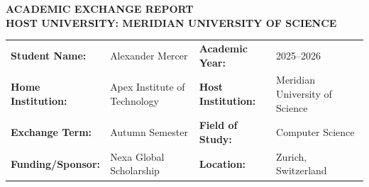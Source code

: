 \documentclass[11pt,a4paper]{article}
\begin{document}
\begin{center}
  \begin{tcolorbox}[
    enhanced,
    colback=primarycolor,
    colframe=primarycolor,
    arc=0pt,
    top=18pt,
    bottom=18pt,
    left=15pt,
    right=15pt,
    halign=center
  ]
    {\color{white}\Huge\bfseries\sffamily ACADEMIC EXCHANGE REPORT} \\[\baselineskip]
    {\color{accentcolor}\large\bfseries\sffamily HOST UNIVERSITY: MERIDIAN UNIVERSITY OF SCIENCE}
  \end{tcolorbox}
\end{center}

\vspace{10pt}

\begin{tcolorbox}[
  colback=lightgray,
  colframe=primarycolor,
  arc=4pt,
  boxrule=1pt,
  title=\sffamily\bfseries\color{white}\faUser\quad Student \& Exchange Profile,
  halign title=left
]
  \sffamily
  \small
  \begin{tabularx}{\textwidth}{l X l X}
    \textbf{Student Name:} & Alexander Mercer & \textbf{Academic Year:} & 2025--2026 \\
    \textbf{Home Institution:} & Apex Institute of Technology & \textbf{Host Institution:} & Meridian University of Science \\
    \textbf{Exchange Term:} & Autumn Semester & \textbf{Field of Study:} & Computer Science \\
    \textbf{Funding/Sponsor:} & Nexa Global Scholarship & \textbf{Location:} & Zurich, Switzerland \\
  \end{tabularx}
\end{tcolorbox}

\vspace{10pt}







\newpage

{}


\end{document}
